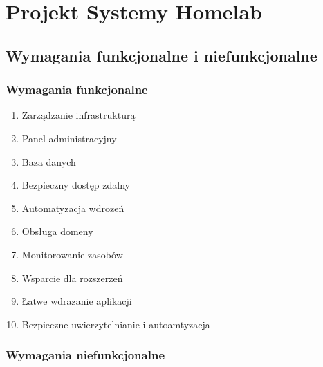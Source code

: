 \chapter{Projekt Systemy Homelab}

\section{Wymagania funkcjonalne i niefunkcjonalne}

\subsection{Wymagania funkcjonalne}

\begin{enumerate}
    \item Zarządzanie infrastrukturą
    \item Panel administracyjny
    \item Baza danych
    \item Bezpieczny dostęp zdalny
    \item Automatyzacja wdrozeń
    \item Obsługa domeny
    \item Monitorowanie zasobów
    \item Wsparcie dla rozszerzeń
    \item Łatwe wdrazanie aplikacji
    \item Bezpieczne uwierzytelnianie i autoamtyzacja
\end{enumerate}

\subsection{Wymagania niefunkcjonalne}

